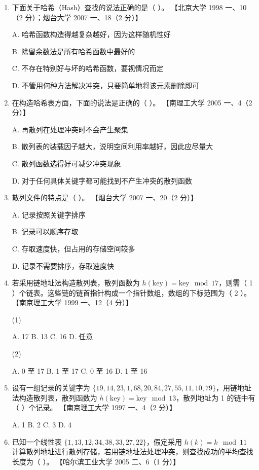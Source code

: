 \documentclass[lang=cn,newtx,10pt,scheme=chinese]{../../elegantbook}
\begin{document}
\begin{enumerate}
    \item 下面关于哈希（Hash）查找的说法正确的是（ ）。  
    【北京大学 1998 一、10（2 分）；烟台大学 2007 一、18（2 分）】  

    A. 哈希函数构造得越复杂越好，因为这样随机性好  

    B. 除留余数法是所有哈希函数中最好的  

    C. 不存在特别好与坏的哈希函数，要视情况而定  

    D. 不管用何种方法解决冲突，只要简单地将该元素删除即可  

    \item 在构造哈希表方面，下面的说法是正确的（ ）。  
    【南理工大学 2005 一、4（2 分）】  

    A. 再散列在处理冲突时不会产生聚集  

    B. 散列表的装载因子越大，说明空间利用率越好，因此应尽量大  

    C. 散列函数选得好可减少冲突现象  

    D. 对于任何具体关键字都可能找到不产生冲突的散列函数  

    \item 散列文件的特点是（ ）。  
    【烟台大学 2007 一、20（2 分）】 

    A. 记录按照关键字排序  

    B. 记录可以顺序存取  

    C. 存取速度快，但占用的存储空间较多  

    D. 记录不需要排序，存取速度快  

    \item 若采用链地址法构造散列表，散列函数为 $h(\text{key}) = \text{key} \mod 17$，则需（ 1 ）个链表。这些链的链首指针构成一个指针数组，数组的下标范围为（ 2 ）。  
    【南京理工大学 1999 一、12（4 分）】 

    (1)  

    A. 17 \quad B. 13 \quad C. 16 \quad D. 任意  

    (2)  

    A. 0 至 17 \quad B. 1 至 17 \quad C. 0 至 16 \quad D. 1 至 16  

    \item 设有一组记录的关键字为 $\{19, 14, 23, 1, 68, 20, 84, 27, 55, 11, 10, 79\}$，用链地址法构造散列表，散列函数为 $h(\text{key}) = \text{key} \mod 13$，散列地址为 1 的链中有（ ）个记录。  
    【南京理工大学 1997 一、4（2 分）】  

    A. 1 \quad B. 2 \quad C. 3 \quad D. 4  

    \item 已知一个线性表 $\{1, 13, 12, 34, 38, 33, 27, 22\}$，假定采用 $h(k) = k \mod 11$ 计算散列地址进行散列存储，若用链地址法处理冲突，则查找成功的平均查找长度为（ ）。  
    【哈尔滨工业大学 2005 二、6（1 分）】  


\end{enumerate}
\end{document}
